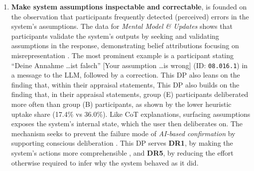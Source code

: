 \begin{enumerate}[label=\textbf{DP-\Alph*}, leftmargin=*]
    \item \textbf{Make system assumptions inspectable and correctable}, is founded on the observation that participants frequently detected (perceived) errors in the system's assumptions. The data for \textit{Mental Model \& Updates} shows that participants validate the system's outputs by seeking and validating assumptions in the response, demonstrating belief attributions focusing on misrepresentation \parencite{Rakoczy2022}. The most prominent example is a participant stating \enquote{Deine Annahme \ldots ist falsch} [Your assumption \ldots is wrong] (ID: \texttt{08.016.1}) in a message to the \ac{LLM}, followed by a correction. This \ac{DP} also leans on the finding that, within their appraisal statements, This DP also builds on the finding that, in their appraisal statements, group (E) participants deliberated more often than group (B) participants, as shown by the lower heuristic uptake share (17.4\% vs 36.0\%). Like \ac{CoT} explanations, surfacing assumptions exposes the system’s internal state, which the user then deliberates on. The mechanism seeks to prevent the failure mode of \textit{\ac{AI}-based confirmation} by supporting conscious deliberation \parencite{Jussupow2021}. This \ac{DP} serves \textbf{DR1}, by making the system's actions more comprehensible \parencite[cf.][]{Amershi2019}, and \textbf{DR5}, by reducing the effort otherwise required to infer why the system behaved as it did.


\end{enumerate}
